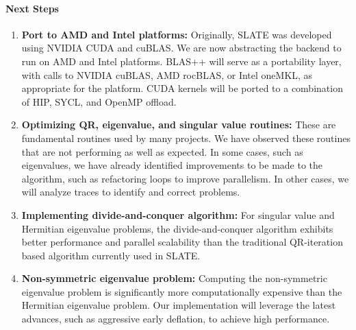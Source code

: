 \paragraph{Next Steps}

\begin{enumerate}

\item
\textbf{Port to AMD and Intel platforms:}
Originally, SLATE was developed using NVIDIA CUDA and cuBLAS. We are now
abstracting the backend to run on AMD and Intel platforms. BLAS++ will
serve as a portability layer, with calls to NVIDIA cuBLAS, AMD rocBLAS,
or Intel oneMKL, as appropriate for the platform. CUDA kernels will be
ported to a combination of HIP, SYCL, and OpenMP offload.

\item
\textbf{Optimizing QR, eigenvalue, and singular value routines:}
These are fundamental routines used by many projects.
We have observed these routines that are not performing as well as expected.
In some cases, such as eigenvalues, we have already identified
improvements to be made to the algorithm, such as refactoring loops to improve
parallelism. In other cases, we will analyze traces to identify and
correct problems.

\item
\textbf{Implementing divide-and-conquer algorithm:}
For singular value and Hermitian eigenvalue problems, the divide-and-conquer
algorithm exhibits better performance and parallel scalability than the
traditional QR-iteration based algorithm currently used in SLATE.

\item
\textbf{Non-symmetric eigenvalue problem:}
Computing the non-symmetric eigenvalue problem is significantly more
computationally expensive than the Hermitian eigenvalue problem. Our
implementation will leverage the latest advances, such as aggressive early
deflation, to achieve high performance.

\end{enumerate}
